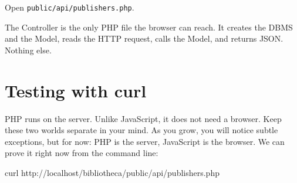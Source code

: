 \documentclass[11pt,a4paper,oneside]{book}
\newenvironment{Shaded}{\begin{snugshade}}{\end{snugshade}}
\newcommand{\ExtensionTok}[1]{#1}
\newcommand{\NormalTok}[1]{#1}
\begin{document}
Open \texttt{public/api/publishers.php}.

The Controller is the only PHP file the browser can reach. It
creates the DBMS and the Model, reads the HTTP request, calls the
Model, and returns JSON. Nothing else.

\hypertarget{testing-with-curl}{%
\section{Testing with curl}\label{testing-with-curl}}

PHP runs on the server. Unlike JavaScript, it does not need a
browser. Keep these two worlds separate in your mind. As you
grow, you will notice subtle exceptions, but for now: PHP is the
server, JavaScript is the browser. We can prove it right now from
the command line:

\begin{Shaded}
\begin{Highlighting}[]
\ExtensionTok{curl}\NormalTok{ http://localhost/bibliotheca/public/api/publishers.php}
\end{Highlighting}
\end{Shaded}
\end{document}
